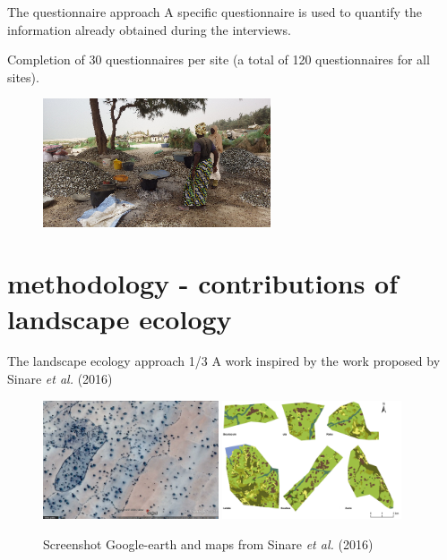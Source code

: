 \documentclass[newPxFont]{beamer}
\begin{document}
\begin{frame}[c]{The questionnaire approach}
\vspace{-1cm}
A specific questionnaire is used to quantify the information already obtained during the interviews.

Completion of 30 questionnaires per site (a total of 120 questionnaires for all sites).
\begin{figure}
	\centering
	\includegraphics[width = 0.6\textwidth]{img/Khoudia.png}
\end{figure}

\end{frame}

\section{methodology - contributions of landscape ecology}

\begin{frame}[c]{The landscape ecology approach 1/3}
\vspace{-1cm}
A work inspired by the work proposed by Sinare \textit{et al.} (2016)
\begin{figure}
	\centering
	\includegraphics[height = 3.5cm]{img/ggearth}
  \includegraphics[height = 3.5cm]{img/Sinare_et_al2016}
  \caption{\small{Screenshot Google-earth and maps from Sinare \textit{et al.} (2016)}}
\end{figure}
\end{frame}
\end{document}
